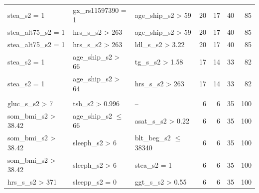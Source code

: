 \documentclass[
  oneside]{book}
\begin{document}
\begin{table}[!h]
\begin{tabular}[t]{lllrrrr}
\hspace{1em}stea\_s2 = 1 & gx\_rs11597390 = 1 & age\_ship\_s2 > 59 & 20 & 17 & 40 & 85\\
\hspace{1em}stea\_alt75\_s2 = 1 & hrs\_s\_s2 > 263 & age\_ship\_s2 > 59 & 20 & 17 & 40 & 85\\
\hspace{1em}stea\_alt75\_s2 = 1 & hrs\_s\_s2 > 263 & ldl\_s\_s2 > 3.22 & 20 & 17 & 40 & 85\\
\hspace{1em}stea\_s2 = 1 & age\_ship\_s2 > 66 & tg\_s\_s2 > 1.58 & 17 & 14 & 33 & 82\\
\hspace{1em}stea\_s2 = 1 & age\_ship\_s2 > 64 & hrs\_s\_s2 > 263 & 17 & 14 & 33 & 82\\
\addlinespace[0.3em]
\multicolumn{7}{l}{\textbf{Target class: C}}\\
\hspace{1em}gluc\_s\_s2 > 7 & tsh\_s2 > 0.996 & -- & 6 & 6 & 35 & 100\\
\hspace{1em}som\_bmi\_s2 > 38.42 & age\_ship\_s2 $\leq$ 66 & asat\_s\_s2 > 0.22 & 6 & 6 & 35 & 100\\
\hspace{1em}som\_bmi\_s2 > 38.42 & sleeph\_s2 > 6 & blt\_beg\_s2 $\leq$ 38340 & 6 & 6 & 35 & 100\\
\hspace{1em}som\_bmi\_s2 > 38.42 & sleeph\_s2 > 6 & stea\_s2 = 1 & 6 & 6 & 35 & 100\\
\hspace{1em}hrs\_s\_s2 > 371 & sleepp\_s2 = 0 & ggt\_s\_s2 > 0.55 & 6 & 6 & 35 & 100\\
\bottomrule
\end{tabular}
\end{table}
\end{document}
